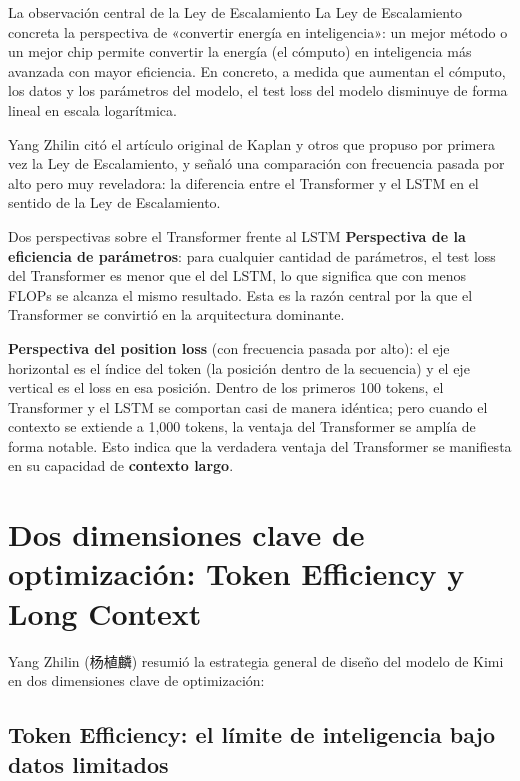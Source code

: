 \documentclass[a4paper]{article}
\begin{document}
\begin{importantbox}{La observación central de la Ley de Escalamiento}
La Ley de Escalamiento concreta la perspectiva de «convertir energía en inteligencia»: un mejor método o un mejor chip permite convertir la energía (el cómputo) en inteligencia más avanzada con mayor eficiencia. En concreto, a medida que aumentan el cómputo, los datos y los parámetros del modelo, el test loss del modelo disminuye de forma lineal en escala logarítmica.
\end{importantbox}

Yang Zhilin citó el artículo original de Kaplan y otros que propuso por primera vez la Ley de Escalamiento, y señaló una comparación con frecuencia pasada por alto pero muy reveladora: la diferencia entre el Transformer y el LSTM en el sentido de la Ley de Escalamiento.

\begin{knowledgebox}{Dos perspectivas sobre el Transformer frente al LSTM}
\textbf{Perspectiva de la eficiencia de parámetros}: para cualquier cantidad de parámetros, el test loss del Transformer es menor que el del LSTM, lo que significa que con menos FLOPs se alcanza el mismo resultado. Esta es la razón central por la que el Transformer se convirtió en la arquitectura dominante.

\textbf{Perspectiva del position loss} (con frecuencia pasada por alto): el eje horizontal es el índice del token (la posición dentro de la secuencia) y el eje vertical es el loss en esa posición. Dentro de los primeros 100 tokens, el Transformer y el LSTM se comportan casi de manera idéntica; pero cuando el contexto se extiende a 1,000 tokens, la ventaja del Transformer se amplía de forma notable. Esto indica que la verdadera ventaja del Transformer se manifiesta en su capacidad de \textbf{contexto largo}.
\end{knowledgebox}

\section{Dos dimensiones clave de optimización: Token Efficiency y Long Context}

Yang Zhilin (杨植麟) resumió la estrategia general de diseño del modelo de Kimi en dos dimensiones clave de optimización:

\subsection{Token Efficiency: el límite de inteligencia bajo datos limitados}
\end{document}
